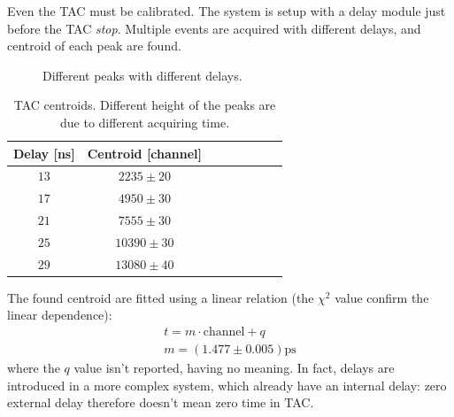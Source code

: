 \documentclass[11pt,a4 paper]{article}
\begin{document}
%


Even the TAC must be calibrated. The system is setup with a delay module just before the TAC \emph{stop}. Multiple events are acquired with different delays, and centroid of each peak are found.

\begin{figure}[H]
    \centering
    \caption{Different peaks with different delays.}
    \label{fig:tac:calibr}
\end{figure}

\begin{table}[H]
    \centering
    \begin{tabular}{cccccccc}
        \toprule
        Delay [ns] & Centroid [channel] \\
        \midrule
        $13$ & $2235\pm 20$ \\
        $17$ & $4950\pm 30$ \\
        $21$ & $7555\pm 30$ \\
        $25$ & $10390\pm 30$ \\
        $29$ & $13080\pm 40$ \\
        \bottomrule
    \end{tabular}
    \caption{TAC centroids. Different height of the peaks are due to different acquiring time.}
    \label{tab:tac:calibr}
\end{table}

The found centroid are fitted using a linear relation (the $\chi^2$ value confirm the linear dependence):
\begin{gather*}
    t = m\cdot \text{channel} + q \\
    m = ( 1.477 \pm 0.005) \si{\pico\second}
\end{gather*}
where the $q$ value isn't reported, having no meaning. In fact, delays are introduced in a more complex system, which already have an internal delay: zero external delay therefore doesn't mean zero time in TAC.
\end{document}
